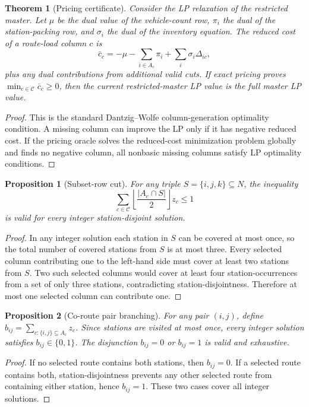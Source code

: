\documentclass[11pt]{article}
\newtheorem{theorem}{Theorem}
\newtheorem{proposition}{Proposition}
\begin{document}
\begin{theorem}[Pricing certificate]
Consider the LP relaxation of the restricted master. Let $\mu$ be the dual value of the vehicle-count row, $\pi_i$ the dual of the station-packing row, and $\sigma_i$ the dual of the inventory equation. The reduced cost of a route-load column $c$ is
\[
\bar c_c=-\mu-\sum_{i\in A_c}\pi_i+\sum_i \sigma_i\Delta_{ic},
\]
plus any dual contributions from additional valid cuts. If exact pricing proves $\min_{c\in\mathcal{C}}\bar c_c\ge 0$, then the current restricted-master LP value is the full master LP value.
\end{theorem}
\begin{proof}
This is the standard Dantzig--Wolfe column-generation optimality condition. A missing column can improve the LP only if it has negative reduced cost. If the pricing oracle solves the reduced-cost minimization problem globally and finds no negative column, all nonbasic missing columns satisfy LP optimality conditions.
\end{proof}

\begin{proposition}[Subset-row cut]
For any triple $S=\{i,j,k\}\subseteq N$, the inequality
\[
\sum_{c\in\mathcal{C}} \left\lfloor\frac{|A_c\cap S|}{2}\right\rfloor z_c\le 1
\]
is valid for every integer station-disjoint solution.
\end{proposition}
\begin{proof}
In any integer solution each station in $S$ can be covered at most once, so the total number of covered stations from $S$ is at most three. Every selected column contributing one to the left-hand side must cover at least two stations from $S$. Two such selected columns would cover at least four station-occurrences from a set of only three stations, contradicting station-disjointness. Therefore at most one selected column can contribute one.
\end{proof}

\begin{proposition}[Co-route pair branching]
For any pair $(i,j)$, define $b_{ij}=\sum_{c:\{i,j\}\subseteq A_c}z_c$. Since stations are visited at most once, every integer solution satisfies $b_{ij}\in\{0,1\}$. The disjunction $b_{ij}=0$ or $b_{ij}=1$ is valid and exhaustive.
\end{proposition}
\begin{proof}
If no selected route contains both stations, then $b_{ij}=0$. If a selected route contains both, station-disjointness prevents any other selected route from containing either station, hence $b_{ij}=1$. These two cases cover all integer solutions.
\end{proof}
\end{document}
